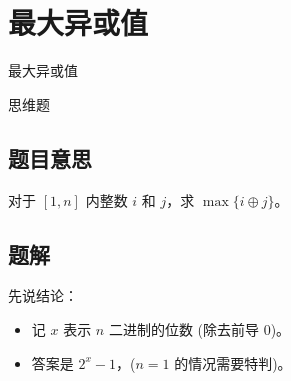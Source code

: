 \def\sectionName{最大异或值}
\section{\sectionName}



\begin{frame}

\isBeamerMode\relax
    {\Huge \sectionName}\par
\fi




思维题



\end{frame}

\subsection{题目意思}
\begin{frame} %
对于 $[1, n]$ 内整数 $i$ 和 $j$，求 $\max\{i \oplus j\}$。
\end{frame}



\subsection{题解}
\begin{frame} %
先说结论：
\begin{itemize}
    \item 记 $x$ 表示 $n$ 二进制的位数 (除去前导 $0$)。
    \item 答案是 $2^x - 1$，($n = 1$ 的情况需要特判)。
\end{itemize}
\end{frame}


